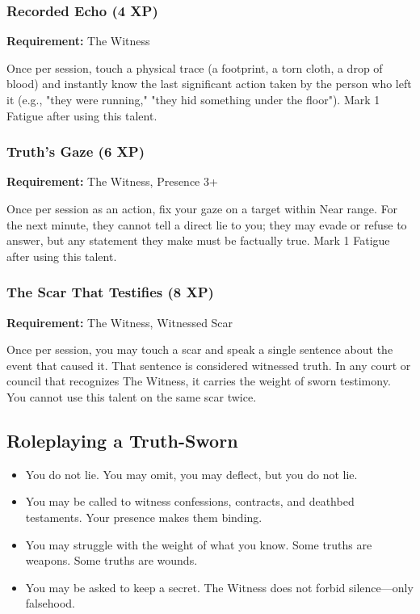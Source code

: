 \subsubsection{Recorded Echo (4 XP)}

\textbf{Requirement:} The Witness

Once per session, touch a physical trace (a footprint, a torn cloth, a drop of blood) and instantly know the last significant action taken by the person who left it (e.g., "they were running," "they hid something under the floor"). Mark 1 Fatigue after using this talent.

\subsubsection{Truth's Gaze (6 XP)}

\textbf{Requirement:} The Witness, Presence 3+

Once per session as an action, fix your gaze on a target within Near range. For the next minute, they cannot tell a direct lie to you; they may evade or refuse to answer, but any statement they make must be factually true. Mark 1 Fatigue after using this talent.

\subsubsection{The Scar That Testifies (8 XP)}

\textbf{Requirement:} The Witness, Witnessed Scar

Once per session, you may touch a scar and speak a single sentence about the event that caused it. That sentence is considered witnessed truth. In any court or council that recognizes The Witness, it carries the weight of sworn testimony. You cannot use this talent on the same scar twice.

\subsection{Roleplaying a Truth-Sworn}

\begin{itemize}
\item You do not lie. You may omit, you may deflect, but you do not lie.
\item You may be called to witness confessions, contracts, and deathbed testaments. Your presence makes them binding.
\item You may struggle with the weight of what you know. Some truths are weapons. Some truths are wounds.
\item You may be asked to keep a secret. The Witness does not forbid silence—only falsehood.
\end{itemize}

